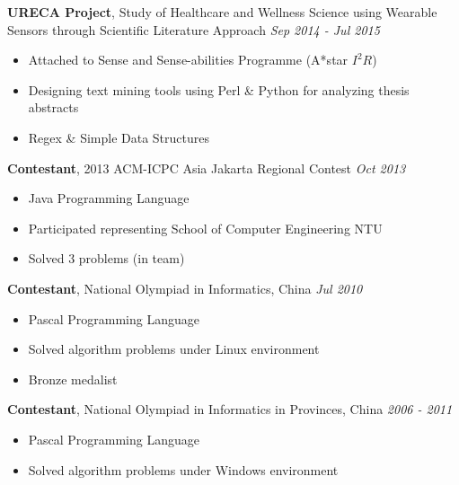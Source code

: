 \documentclass[a4paper, 12pt]{article}
\newenvironment{changemargin}[2]{%
  \begin{list}{}{%
      \setlength{\topsep}{0pt}%
      \setlength{\leftmargin}{#1}%
      \setlength{\rightmargin}{#2}%
      \setlength{\listparindent}{\parindent}%
      \setlength{\itemindent}{\parindent}%
      \setlength{\parsep}{\parskip}%
    }%
  \item[]}{\end{list}
}
\newenvironment{body}
{
\vspace*{-16pt}
\begin{changemargin}{-0.25in}{-0.5in}
}	
{
\end{changemargin}
}
\begin{document}
\begin{body}
  \vspace{14pt}

  \textbf{URECA Project}, {Study of Healthcare and Wellness Science using Wearable Sensors through Scientific Literature Approach} \hfill \emph{Sep 2014 - Jul 2015}\\
  \vspace*{-4pt}
  \begin{itemize} \itemsep -0pt  \small
  \item Attached to Sense and Sense-abilities Programme (A*star $I^{2}R$)
  \item Designing text mining tools using Perl \& Python for analyzing thesis abstracts
  \item Regex \& Simple Data Structures
  \end{itemize}

  \textbf{Contestant}, {2013 ACM-ICPC Asia Jakarta Regional Contest} \hfill \emph{Oct 2013}\\
  \vspace*{-4pt}
  \begin{itemize} \itemsep -0pt  \small
  \item Java Programming Language
  \item Participated representing School of Computer Engineering NTU
  \item Solved 3 problems (in team)
  \end{itemize}
  
  \textbf {Contestant}, {National Olympiad in Informatics, China} \hfill \emph{Jul 2010}\\
  \vspace*{-4pt}
  \begin{itemize} \itemsep -0pt \small
  \item Pascal Programming Language
  \item Solved algorithm problems under Linux environment
  \item Bronze medalist
  \end{itemize}

  \textbf {Contestant}, {National Olympiad in Informatics in Provinces, China} \hfill \emph{2006 - 2011}\\
  \vspace*{-4pt}
  \begin{itemize} \itemsep -0pt \small
  \item Pascal Programming Language
  \item Solved algorithm problems under Windows environment
  \end{itemize}
\end{body}
\end{document}
